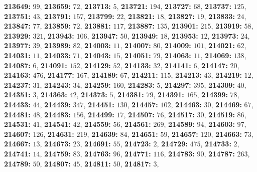 \textsf{\bfseries 213649:} $99$, \textsf{\bfseries 213659:} $72$, \textsf{\bfseries 213713:} $5$, \textsf{\bfseries 213721:} $194$, \textsf{\bfseries 213727:} $68$, \textsf{\bfseries 213737:} $125$, \textsf{\bfseries 213751:} $43$, \textsf{\bfseries 213791:} $157$, \textsf{\bfseries 213799:} $22$, \textsf{\bfseries 213821:} $18$, \textsf{\bfseries 213827:} $19$, \textsf{\bfseries 213833:} $24$, \textsf{\bfseries 213847:} $77$, \textsf{\bfseries 213859:} $72$, \textsf{\bfseries 213881:} $117$, \textsf{\bfseries 213887:} $135$, \textsf{\bfseries 213901:} $215$, \textsf{\bfseries 213919:} $58$, \textsf{\bfseries 213929:} $321$, \textsf{\bfseries 213943:} $106$, \textsf{\bfseries 213947:} $50$, \textsf{\bfseries 213949:} $18$, \textsf{\bfseries 213953:} $12$, \textsf{\bfseries 213973:} $24$, \textsf{\bfseries 213977:} $39$, \textsf{\bfseries 213989:} $82$, \textsf{\bfseries 214003:} $11$, \textsf{\bfseries 214007:} $80$, \textsf{\bfseries 214009:} $101$, \textsf{\bfseries 214021:} $62$, \textsf{\bfseries 214031:} $11$, \textsf{\bfseries 214033:} $71$, \textsf{\bfseries 214043:} $15$, \textsf{\bfseries 214051:} $79$, \textsf{\bfseries 214063:} $11$, \textsf{\bfseries 214069:} $138$, \textsf{\bfseries 214087:} $6$, \textsf{\bfseries 214091:} $152$, \textsf{\bfseries 214129:} $52$, \textsf{\bfseries 214133:} $32$, \textsf{\bfseries 214141:} $6$, \textsf{\bfseries 214147:} $20$, \textsf{\bfseries 214163:} $476$, \textsf{\bfseries 214177:} $167$, \textsf{\bfseries 214189:} $67$, \textsf{\bfseries 214211:} $115$, \textsf{\bfseries 214213:} $43$, \textsf{\bfseries 214219:} $12$, \textsf{\bfseries 214237:} $31$, \textsf{\bfseries 214243:} $34$, \textsf{\bfseries 214259:} $160$, \textsf{\bfseries 214283:} $5$, \textsf{\bfseries 214297:} $395$, \textsf{\bfseries 214309:} $40$, \textsf{\bfseries 214351:} $3$, \textsf{\bfseries 214363:} $42$, \textsf{\bfseries 214373:} $5$, \textsf{\bfseries 214381:} $79$, \textsf{\bfseries 214391:} $165$, \textsf{\bfseries 214399:} $78$, \textsf{\bfseries 214433:} $44$, \textsf{\bfseries 214439:} $347$, \textsf{\bfseries 214451:} $130$, \textsf{\bfseries 214457:} $102$, \textsf{\bfseries 214463:} $30$, \textsf{\bfseries 214469:} $67$, \textsf{\bfseries 214481:} $48$, \textsf{\bfseries 214483:} $156$, \textsf{\bfseries 214499:} $17$, \textsf{\bfseries 214507:} $76$, \textsf{\bfseries 214517:} $30$, \textsf{\bfseries 214519:} $86$, \textsf{\bfseries 214531:} $41$, \textsf{\bfseries 214541:} $42$, \textsf{\bfseries 214559:} $56$, \textsf{\bfseries 214561:} $269$, \textsf{\bfseries 214589:} $94$, \textsf{\bfseries 214603:} $97$, \textsf{\bfseries 214607:} $126$, \textsf{\bfseries 214631:} $219$, \textsf{\bfseries 214639:} $84$, \textsf{\bfseries 214651:} $59$, \textsf{\bfseries 214657:} $120$, \textsf{\bfseries 214663:} $73$, \textsf{\bfseries 214667:} $13$, \textsf{\bfseries 214673:} $23$, \textsf{\bfseries 214691:} $55$, \textsf{\bfseries 214723:} $2$, \textsf{\bfseries 214729:} $475$, \textsf{\bfseries 214733:} $2$, \textsf{\bfseries 214741:} $14$, \textsf{\bfseries 214759:} $83$, \textsf{\bfseries 214763:} $96$, \textsf{\bfseries 214771:} $116$, \textsf{\bfseries 214783:} $90$, \textsf{\bfseries 214787:} $263$, \textsf{\bfseries 214789:} $50$, \textsf{\bfseries 214807:} $45$, \textsf{\bfseries 214811:} $50$, \textsf{\bfseries 214817:} $3$, 
